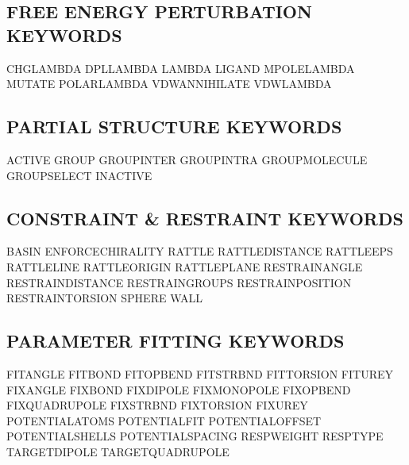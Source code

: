 \documentclass[letterpaper,11pt,english]{sphinxmanual}
\begin{document}
\subsection{FREE ENERGY PERTURBATION KEYWORDS}
\label{\detokenize{text/keywords:free-energy-perturbation-keywords}}
CHG\sphinxhyphen{}LAMBDA      DPL\sphinxhyphen{}LAMBDA      LAMBDA
LIGAND  MPOLE\sphinxhyphen{}LAMBDA    MUTATE
POLAR\sphinxhyphen{}LAMBDA    VDW\sphinxhyphen{}ANNIHILATE  VDW\sphinxhyphen{}LAMBDA


\subsection{PARTIAL STRUCTURE KEYWORDS}
\label{\detokenize{text/keywords:partial-structure-keywords}}
ACTIVE  GROUP   GROUP\sphinxhyphen{}INTER
GROUP\sphinxhyphen{}INTRA     GROUP\sphinxhyphen{}MOLECULE  GROUP\sphinxhyphen{}SELECT
INACTIVE


\subsection{CONSTRAINT \& RESTRAINT KEYWORDS}
\label{\detokenize{text/keywords:constraint-restraint-keywords}}
BASIN   ENFORCE\sphinxhyphen{}CHIRALITY       RATTLE
RATTLE\sphinxhyphen{}DISTANCE RATTLE\sphinxhyphen{}EPS      RATTLE\sphinxhyphen{}LINE
RATTLE\sphinxhyphen{}ORIGIN   RATTLE\sphinxhyphen{}PLANE    RESTRAIN\sphinxhyphen{}ANGLE
RESTRAIN\sphinxhyphen{}DISTANCE       RESTRAIN\sphinxhyphen{}GROUPS RESTRAIN\sphinxhyphen{}POSITION
RESTRAIN\sphinxhyphen{}TORSION        SPHERE  WALL


\subsection{PARAMETER FITTING KEYWORDS}
\label{\detokenize{text/keywords:parameter-fitting-keywords}}
FIT\sphinxhyphen{}ANGLE       FIT\sphinxhyphen{}BOND        FIT\sphinxhyphen{}OPBEND
FIT\sphinxhyphen{}STRBND      FIT\sphinxhyphen{}TORSION     FIT\sphinxhyphen{}UREY
FIX\sphinxhyphen{}ANGLE       FIX\sphinxhyphen{}BOND        FIX\sphinxhyphen{}DIPOLE
FIX\sphinxhyphen{}MONOPOLE    FIX\sphinxhyphen{}OPBEND      FIX\sphinxhyphen{}QUADRUPOLE
FIX\sphinxhyphen{}STRBND      FIX\sphinxhyphen{}TORSION     FIX\sphinxhyphen{}UREY
POTENTIAL\sphinxhyphen{}ATOMS POTENTIAL\sphinxhyphen{}FIT   POTENTIAL\sphinxhyphen{}OFFSET
POTENTIAL\sphinxhyphen{}SHELLS        POTENTIAL\sphinxhyphen{}SPACING       RESP\sphinxhyphen{}WEIGHT
RESPTYPE        TARGET\sphinxhyphen{}DIPOLE   TARGET\sphinxhyphen{}QUADRUPOLE
\end{document}
